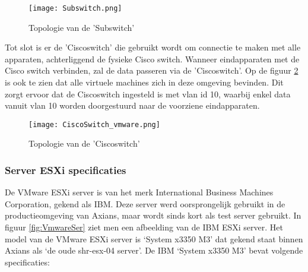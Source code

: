 \begin{figure}[H]
	\centering
	\texttt{[image: Subswitch.png]}
	\caption{Topologie van de 'Sub\textunderscore switch'}
	\label{fig:subswitch}
\end{figure}

\newline
Tot slot is er de 'Cisco\textunderscore switch' die gebruikt wordt om connectie te maken met alle apparaten, achterliggend de fysieke Cisco switch. Wanneer eindapparaten met de Cisco switch verbinden, zal de data passeren via de 'Cisco\textunderscore switch'. Op de figuur \ref{fig:Ciscoswitch} is ook te zien dat alle virtuele machines zich in deze omgeving bevinden. Dit zorgt ervoor dat de Cisco\textunderscore switch ingesteld is met vlan id 10, waarbij enkel data vanuit vlan 10 worden doorgestuurd naar de voorziene eindapparaten.

\begin{figure}[H]
	\centering
	\texttt{[image: CiscoSwitch\_vmware.png]}
	\caption{Topologie van de 'Cisco\textunderscore switch'}
	\label{fig:Ciscoswitch}
\end{figure}

\subsubsection{Server ESXi specificaties}
De VMware ESXi server is van het merk International Business Machines Corporation, gekend als IBM. Deze server werd oorsprongelijk gebruikt in de productieomgeving van Axians, maar wordt sinds kort als test server gebruikt. In figuur \ref{fig:VmwareSer} ziet men een afbeelding van de IBM ESXi server.
\newline
\newline
Het model van de VMware ESXi server is ‘System x3350 M3’ dat gekend staat binnen Axians als ‘de oude shr-esx-04 server’. De IBM ‘System x3350 M3’ bevat volgende specificaties:


